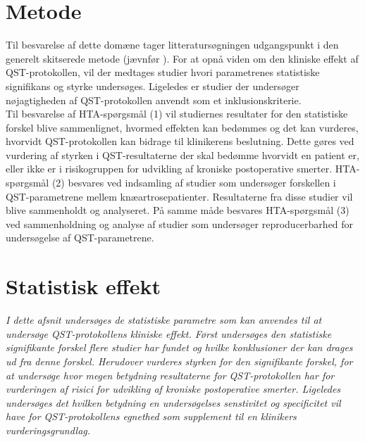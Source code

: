 \section{Metode}
Til besvarelse af dette domæne tager litteratursøgningen udgangspunkt i den generelt skitserede metode (jævnfør ). For at opnå viden om den kliniske effekt af QST-protokollen, vil der medtages studier hvori parametrenes statistiske signifikans og styrke undersøges. Ligeledes er studier der undersøger nøjagtigheden af QST-protokollen anvendt som et inklusionskriterie. \\ 
Til besvarelse af HTA-spørgsmål (1) vil studiernes resultater for den statistiske forskel blive sammenlignet, hvormed effekten kan bedømmes og det kan vurderes, hvorvidt QST-protokollen kan bidrage til klinikerens beslutning. Dette gøres ved vurdering af styrken i QST-resultaterne der skal bedømme hvorvidt en patient er, eller ikke er i risikogruppen for udvikling af kroniske postoperative smerter. HTA-spørgsmål (2) besvares ved indsamling af studier som undersøger forskellen i QST-parametrene mellem knæartrosepatienter. Resultaterne fra disse studier vil blive sammenholdt og analyseret. På samme måde besvares HTA-spørgsmål (3) ved sammenholdning og analyse af studier som undersøger reproducerbarhed for undersøgelse af QST-parametrene.

\section{Statistisk effekt}
\textit{I dette afsnit undersøges de statistiske parametre som kan anvendes til at undersøge QST-protokollens kliniske effekt. Først undersøges den statistiske signifikante forskel flere studier har fundet og hvilke konklusioner der kan drages ud fra denne forskel. Herudover vurderes styrken for den signifikante forskel, for at undersøge hvor megen betydning resultaterne for QST-protokollen har for vurderingen af risici for udvikling af kroniske postoperative smerter. Ligeledes undersøges det hvilken betydning en undersøgelses senstivitet og specificitet vil have for QST-protokollens egnethed som supplement til en klinikers vurderingsgrundlag.}


